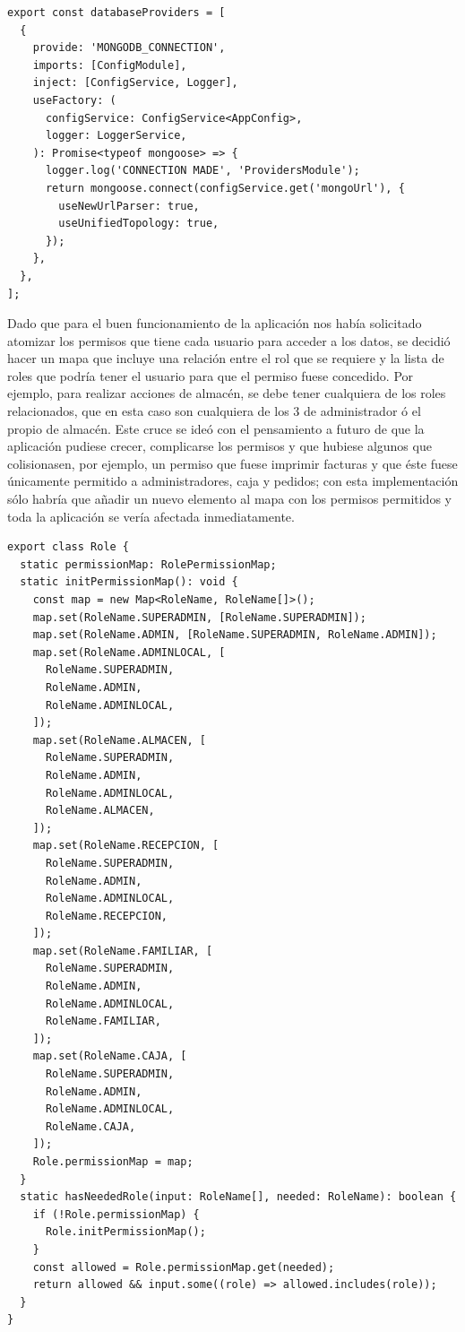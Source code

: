 \begin{lstlisting}[caption={Inyección proveedores ddbb},label=cod:ddbb-providers-injection]
export const databaseProviders = [
  {
    provide: 'MONGODB_CONNECTION',
    imports: [ConfigModule],
    inject: [ConfigService, Logger],
    useFactory: (
      configService: ConfigService<AppConfig>,
      logger: LoggerService,
    ): Promise<typeof mongoose> => {
      logger.log('CONNECTION MADE', 'ProvidersModule');
      return mongoose.connect(configService.get('mongoUrl'), {
        useNewUrlParser: true,
        useUnifiedTopology: true,
      });
    },
  },
];
\end{lstlisting}
\vspace{1em}
\par Dado que para el buen funcionamiento de la aplicación nos había solicitado atomizar los permisos que tiene cada usuario para acceder a los datos, se decidió hacer un mapa que incluye una relación entre el rol que se requiere y la lista de roles que podría tener el usuario para que el permiso fuese concedido. Por ejemplo, para realizar acciones de almacén, se debe tener cualquiera de los roles relacionados, que en esta caso son cualquiera de los 3 de administrador ó el propio de almacén. Este cruce se ideó con el pensamiento a futuro de que la aplicación pudiese crecer, complicarse los permisos y que hubiese algunos que colisionasen, por ejemplo, un permiso que fuese imprimir facturas y que éste fuese únicamente permitido a administradores, caja y pedidos; con esta implementación sólo habría que añadir un nuevo elemento al mapa con los permisos permitidos y toda la aplicación se vería afectada inmediatamente.
\clearpage
\begin{lstlisting}[caption={Gestión de roles para acceder a datos},label=cod:ddbb-roles]
export class Role {
  static permissionMap: RolePermissionMap;
  static initPermissionMap(): void {
    const map = new Map<RoleName, RoleName[]>();
    map.set(RoleName.SUPERADMIN, [RoleName.SUPERADMIN]);
    map.set(RoleName.ADMIN, [RoleName.SUPERADMIN, RoleName.ADMIN]);
    map.set(RoleName.ADMINLOCAL, [
      RoleName.SUPERADMIN,
      RoleName.ADMIN,
      RoleName.ADMINLOCAL,
    ]);
    map.set(RoleName.ALMACEN, [
      RoleName.SUPERADMIN,
      RoleName.ADMIN,
      RoleName.ADMINLOCAL,
      RoleName.ALMACEN,
    ]);
    map.set(RoleName.RECEPCION, [
      RoleName.SUPERADMIN,
      RoleName.ADMIN,
      RoleName.ADMINLOCAL,
      RoleName.RECEPCION,
    ]);
    map.set(RoleName.FAMILIAR, [
      RoleName.SUPERADMIN,
      RoleName.ADMIN,
      RoleName.ADMINLOCAL,
      RoleName.FAMILIAR,
    ]);
    map.set(RoleName.CAJA, [
      RoleName.SUPERADMIN,
      RoleName.ADMIN,
      RoleName.ADMINLOCAL,
      RoleName.CAJA,
    ]);
    Role.permissionMap = map;
  }
  static hasNeededRole(input: RoleName[], needed: RoleName): boolean {
    if (!Role.permissionMap) {
      Role.initPermissionMap();
    }
    const allowed = Role.permissionMap.get(needed);
    return allowed && input.some((role) => allowed.includes(role));
  }
}
\end{lstlisting}
\clearpage

